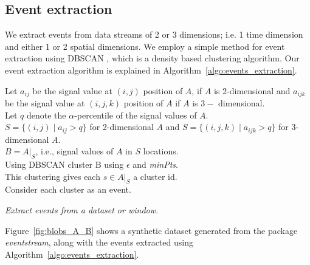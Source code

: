 \documentclass[a4paper,11pt]{article}
\begin{document}
\subsection{Event extraction}

We extract events from data streams of 2 or 3 dimensions; i.e. 1 time dimension and either 1 or 2 spatial dimensions. We employ a simple method for event extraction using DBSCAN \cite{ester1996density}, which is a density based clustering algorithm. Our event extraction algorithm is explained in Algorithm~\ref{algo:events_extraction}.

\DontPrintSemicolon
\begin{algorithm}\fontsize{9}{10}\selectfont
	Let $a_{ij}$ be the signal value at $(i, j)$ position of $A$, if $A$ is 2-dimensional and $a_{ijk}$ be the signal value at $(i, j, k)$ position of $A$ if $A$ is $3-$ dimensional. \\
	Let $q$ denote the $\alpha$-percentile of the signal values of $A$. \\
	$S = \{ (i,j) \mid a_{ij} > q \}$ for 2-dimensional $A$ and
	$S = \{ (i,j, k) \mid a_{ijk} > q \}$ for 3-dimensional $A$. \\
	$ B = A|_S$, i.e., signal values of $A$ in $S$ locations. \\
	Using DBSCAN cluster B using $\epsilon$ and \textit{minPts}. \\
	This clustering gives each $s \in A|_S$ a cluster id. \\

	Consider each cluster as an event. \,
	\caption{\itshape Extract events from a dataset or window.}
	\label{algo:events_extraction}
\end{algorithm}

Figure~\ref{fig:blobs_A_B} shows a  synthetic dataset generated from the package \textit{eventstream}, along with the events extracted using Algorithm~\ref{algo:events_extraction}.
\end{document}
